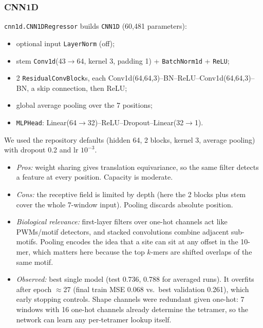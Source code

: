 \subsubsection{CNN1D}
\texttt{cnn1d.CNN1DRegressor} builds \texttt{CNN1D} (60{,}481 parameters):
\begin{itemize}
\item optional input \texttt{LayerNorm} (off);
\item stem \texttt{Conv1d}(43$\to$64, kernel 3, padding 1) + \texttt{BatchNorm1d} + \texttt{ReLU};
\item 2 \texttt{ResidualConvBlock}s, each Conv1d(64,64,3)--BN--ReLU--Conv1d(64,64,3)--BN, a skip connection, then ReLU;
\item global average pooling over the 7 positions;
\item \texttt{MLPHead}: Linear(64$\to$32)--ReLU--Dropout--Linear(32$\to$1).
\end{itemize}
We used the repository defaults (hidden 64, 2 blocks, kernel 3, average pooling) with dropout 0.2 and lr $10^{-3}$.
\begin{itemize}
\item \emph{Pros:} weight sharing gives translation equivariance, so the same filter detects a feature at every position. Capacity is moderate.
\item \emph{Cons:} the receptive field is limited by depth (here the 2 blocks plus stem cover the whole 7-window input). Pooling discards absolute position.
\item \emph{Biological relevance:} first-layer filters over one-hot channels act like PWMs/motif detectors, and stacked convolutions combine adjacent sub-motifs. Pooling encodes the idea that a site can sit at any offset in the 10-mer, which matters here because the top $k$-mers are shifted overlaps of the same motif.
\item \emph{Observed:} best single model (test 0.736, 0.788 for averaged runs). It overfits after epoch $\approx$27 (final train MSE 0.068 vs.\ best validation 0.261), which early stopping controls. Shape channels were redundant given one-hot: 7 windows with 16 one-hot channels already determine the tetramer, so the network can learn any per-tetramer lookup itself.
\end{itemize}

